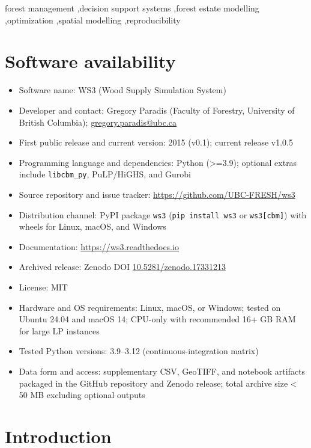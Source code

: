 \documentclass[review]{elsarticle}
\begin{document}
\begin{frontmatter}
\begin{keyword}
forest management \sep decision support systems \sep forest estate modelling \sep optimization \sep spatial modelling \sep reproducibility
\end{keyword}

\section*{Software availability}
\begin{itemize}
  \item Software name: WS3 (Wood Supply Simulation System)
  \item Developer and contact: Gregory Paradis (Faculty of Forestry, University of British Columbia); \href{mailto:gregory.paradis@ubc.ca}{gregory.paradis@ubc.ca}
  \item First public release and current version: 2015 (v0.1); current release v1.0.5
  \item Programming language and dependencies: Python (>=3.9); optional extras include \texttt{libcbm\_py}, PuLP/HiGHS, and Gurobi
  \item Source repository and issue tracker: \url{https://github.com/UBC-FRESH/ws3}
  \item Distribution channel: PyPI package \texttt{ws3} (\texttt{pip install ws3} or \texttt{ws3[cbm]}) with wheels for Linux, macOS, and Windows
  \item Documentation: \url{https://ws3.readthedocs.io}
  \item Archived release: Zenodo DOI \href{https://doi.org/10.5281/zenodo.17331213}{10.5281/zenodo.17331213}
  \item License: MIT
  \item Hardware and OS requirements: Linux, macOS, or Windows; tested on Ubuntu 24.04 and macOS 14; CPU-only with recommended 16+ GB RAM for large LP instances
  \item Tested Python versions: 3.9--3.12 (continuous-integration matrix)
  \item Data form and access: supplementary CSV, GeoTIFF, and notebook artifacts packaged in the GitHub repository and Zenodo release; total archive size < 50 MB excluding optional outputs
\end{itemize}

\end{frontmatter}

\clearpage

\linenumbers

\section{Introduction}
\end{document}
